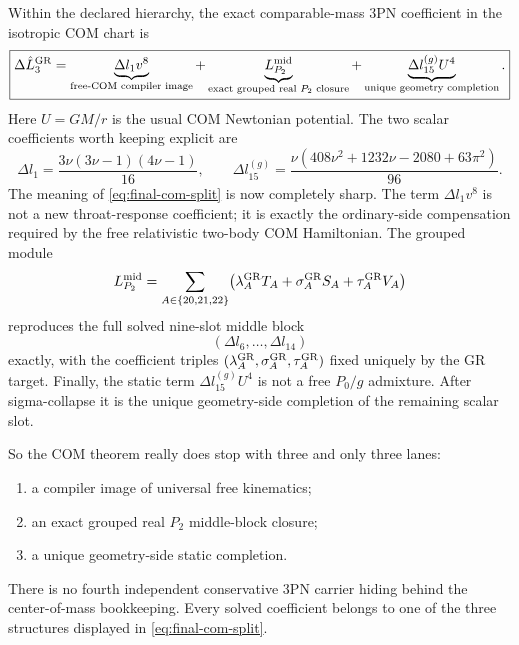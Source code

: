\documentclass[11pt]{article}
\begin{document}
Within the declared hierarchy, the exact comparable-mass $3$PN coefficient in the
isotropic COM chart is
\begin{equation}
\boxed{
\Delta \hat L_3^{\rm GR}
=
\underbrace{\Delta l_1 v^8}_{\text{free-COM compiler image}}
+
\underbrace{L_{P_2}^{\rm mid}}_{\text{exact grouped real }P_2\text{ closure}}
+
\underbrace{\Delta l_{15}^{(g)}U^4}_{\text{unique geometry completion}}.
}
\label{eq:final-com-split}
\end{equation}
Here \(U=GM/r\) is the usual COM Newtonian potential.
The two scalar coefficients worth keeping explicit are
\begin{equation}
\boxed{
\Delta l_1=\frac{3\nu(3\nu-1)(4\nu-1)}{16},
\qquad
\Delta l_{15}^{(g)}
=
\frac{\nu(408\nu^2+1232\nu-2080+63\pi^2)}{96}.
}
\label{eq:final-com-scalars}
\end{equation}
The meaning of \eqref{eq:final-com-split} is now completely sharp.  The term
$\Delta l_1v^8$ is not a new throat-response coefficient; it is exactly the
ordinary-side compensation required by the free relativistic two-body COM
Hamiltonian.  The grouped module
\begin{equation}
L_{P_2}^{\rm mid}
=
\sum_{A\in\{20,21,22\}}
\bigl(
\lambda_A^{\rm GR}T_A+\sigma_A^{\rm GR}S_A+\tau_A^{\rm GR}V_A
\bigr)
\label{eq:final-com-grouped-module}
\end{equation}
reproduces the full solved nine-slot middle block
\[
(\Delta l_6,\ldots,\Delta l_{14})
\]
exactly, with the coefficient triples
\((\lambda_A^{\rm GR},\sigma_A^{\rm GR},\tau_A^{\rm GR})\) fixed uniquely by the
GR target.  Finally, the static term
\(\Delta l_{15}^{(g)}U^4\) is not a free $P_0/g$ admixture.  After sigma-collapse
it is the unique geometry-side completion of the remaining scalar slot.

So the COM theorem really does stop with three and only three lanes:

\begin{enumerate}
  \item a compiler image of universal free kinematics;
  \item an exact grouped real $P_2$ middle-block closure;
  \item a unique geometry-side static completion.
\end{enumerate}

There is no fourth independent conservative $3$PN carrier hiding behind the
center-of-mass bookkeeping.  Every solved coefficient belongs to one of the
three structures displayed in \eqref{eq:final-com-split}.
\end{document}
